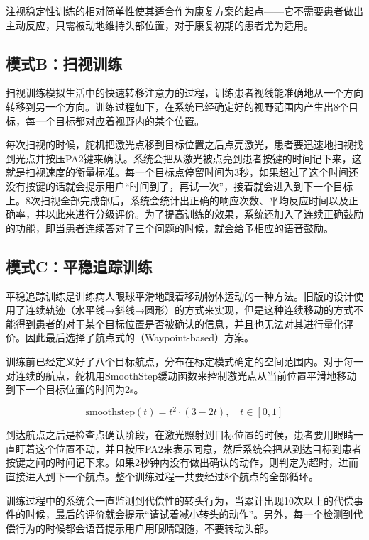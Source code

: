 注视稳定性训练的相对简单性使其适合作为康复方案的起点——它不需要患者做出主动反应，只需被动地维持头部位置，对于康复初期的患者尤为适用。

\subsection{模式B：扫视训练}

扫视训练模拟生活中的快速转移注意力的过程，训练患者视线能准确地从一个方向转移到另一个方向。训练过程如下，在系统已经确定好的视野范围内产生出8个目标，每一个目标都对应着视野内的某个位置。

每次扫视的时候，舵机把激光点移到目标位置之后点亮激光，患者要迅速地扫视找到光点并按压PA2键来确认。系统会把从激光被点亮到患者按键的时间记下来，这就是扫视速度的衡量标准。每一个目标点停留时间为3秒，如果超过了这个时间还没有按键的话就会提示用户“时间到了，再试一次”，接着就会进入到下一个目标上。8次扫视全部完成部后，系统会统计出正确的响应次数、平均反应时间以及正确率，并以此来进行分级评价。为了提高训练的效果，系统还加入了连续正确鼓励的功能，即当患者连续答对了三个问题的时候，就会给予相应的语音鼓励。

\subsection{模式C：平稳追踪训练}

平稳追踪训练是训练病人眼球平滑地跟着移动物体运动的一种方法。旧版的设计使用了连续轨迹（水平线→斜线→圆形）的方式来实现，但是这种连续移动的方式不能得到患者的对于某个目标位置是否被确认的信息，并且也无法对其进行量化评价。因此最后选择了航点式的（Waypoint-based）方案。

训练前已经定义好了八个目标航点，分布在标定模式确定的空间范围内。对于每一对连续的航点，舵机用SmoothStep缓动函数来控制激光点从当前位置平滑地移动到下一个目标位置的时间为2s。

\begin{equation}
\text{smoothstep}(t) = t^2 \cdot (3 - 2t),\quad t \in [0, 1]
\label{eq:smoothstep}
\end{equation}

到达航点之后是检查点确认阶段，在激光照射到目标位置的时候，患者要用眼睛一直盯着这个位置不动，并且按压PA2来表示同意，然后系统会把从到达目标到患者按键之间的时间记下来。如果2秒钟内没有做出确认的动作，则判定为超时，进而直接进入到下一个航点。整个训练过程一共要经过8个航点的全部循环。

训练过程中的系统会一直监测到代偿性的转头行为，当累计出现10次以上的代偿事件的时候，最后的评价就会提示“请试着减小转头的动作”。另外，每一个检测到代偿行为的时候都会语音提示用户用眼睛跟随，不要转动头部。

